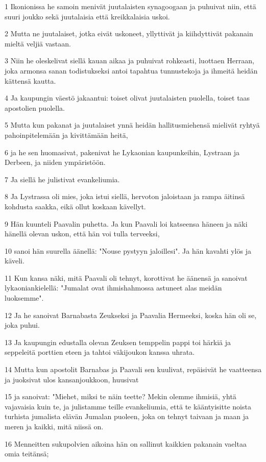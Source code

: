 \par 1 Ikonionissa he samoin menivät juutalaisten synagoogaan ja puhuivat niin, että suuri joukko sekä juutalaisia että kreikkalaisia uskoi.
\par 2 Mutta ne juutalaiset, jotka eivät uskoneet, yllyttivät ja kiihdyttivät pakanain mieltä veljiä vastaan.
\par 3 Niin he oleskelivat siellä kauan aikaa ja puhuivat rohkeasti, luottaen Herraan, joka armonsa sanan todistukseksi antoi tapahtua tunnustekoja ja ihmeitä heidän kättensä kautta.
\par 4 Ja kaupungin väestö jakaantui: toiset olivat juutalaisten puolella, toiset taas apostolien puolella.
\par 5 Mutta kun pakanat ja juutalaiset ynnä heidän hallitusmiehensä mielivät ryhtyä pahoinpitelemään ja kivittämään heitä,
\par 6 ja he sen huomasivat, pakenivat he Lykaonian kaupunkeihin, Lystraan ja Derbeen, ja niiden ympäristöön.
\par 7 Ja siellä he julistivat evankeliumia.
\par 8 Ja Lystrassa oli mies, joka istui siellä, hervoton jaloistaan ja rampa äitinsä kohdusta saakka, eikä ollut koskaan kävellyt.
\par 9 Hän kuunteli Paavalin puhetta. Ja kun Paavali loi katseensa häneen ja näki hänellä olevan uskon, että hän voi tulla terveeksi,
\par 10 sanoi hän suurella äänellä: "Nouse pystyyn jaloillesi". Ja hän kavahti ylös ja käveli.
\par 11 Kun kansa näki, mitä Paavali oli tehnyt, korottivat he äänensä ja sanoivat lykaoniankielellä: "Jumalat ovat ihmishahmossa astuneet alas meidän luoksemme".
\par 12 Ja he sanoivat Barnabasta Zeukseksi ja Paavalia Hermeeksi, koska hän oli se, joka puhui.
\par 13 Ja kaupungin edustalla olevan Zeuksen temppelin pappi toi härkiä ja seppeleitä porttien eteen ja tahtoi väkijoukon kanssa uhrata.
\par 14 Mutta kun apostolit Barnabas ja Paavali sen kuulivat, repäisivät he vaatteensa ja juoksivat ulos kansanjoukkoon, huusivat
\par 15 ja sanoivat: "Miehet, miksi te näin teette? Mekin olemme ihmisiä, yhtä vajavaisia kuin te, ja julistamme teille evankeliumia, että te kääntyisitte noista turhista jumalista elävän Jumalan puoleen, joka on tehnyt taivaan ja maan ja meren ja kaikki, mitä niissä on.
\par 16 Menneitten sukupolvien aikoina hän on sallinut kaikkien pakanain vaeltaa omia teitänsä;
